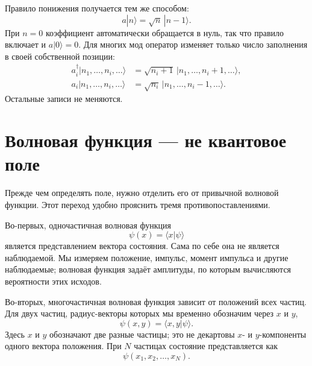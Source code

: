 \begin{classroomqa}
\end{classroomqa}

Правило понижения получается тем же способом:
\begin{equation}
a|n\rangle=\sqrt n\,|n-1\rangle.
\label{eq:l06-lowering-rule}
\end{equation}
При \(n=0\) коэффициент автоматически обращается в нуль, так что правило включает и \(a|0\rangle=0\). Для многих мод оператор изменяет только число заполнения в своей собственной позиции:
\begin{align}
a_i^\dagger|n_1,\ldots,n_i,\ldots\rangle
&=\sqrt{n_i+1}\,|n_1,\ldots,n_i+1,\ldots\rangle, \\
a_i|n_1,\ldots,n_i,\ldots\rangle
&=\sqrt{n_i}\,|n_1,\ldots,n_i-1,\ldots\rangle.
\label{eq:l06-multimode-ladders}
\end{align}
Остальные записи не меняются.

\section{Волновая функция — не квантовое поле}

Прежде чем определять поле, нужно отделить его от привычной волновой функции. Этот переход удобно прояснить тремя противопоставлениями.

Во-первых, одночастичная волновая функция
\begin{equation}
\psi(x)=\langle x|\psi\rangle
\end{equation}
является представлением вектора состояния. Сама по себе она не является наблюдаемой. Мы измеряем положение, импульс, момент импульса и другие наблюдаемые; волновая функция задаёт амплитуды, по которым вычисляются вероятности этих исходов.

Во-вторых, многочастичная волновая функция зависит от положений всех частиц. Для двух частиц, радиус-векторы которых мы временно обозначим через \(x\) и \(y\),
\begin{equation}
\psi(x,y)=\langle x,y|\psi\rangle.
\end{equation}
Здесь \(x\) и \(y\) обозначают две разные частицы; это не декартовы \(x\)- и \(y\)-компоненты одного вектора положения. При \(N\) частицах состояние представляется как
\begin{equation}
\psi(x_1,x_2,\ldots,x_N).
\end{equation}

